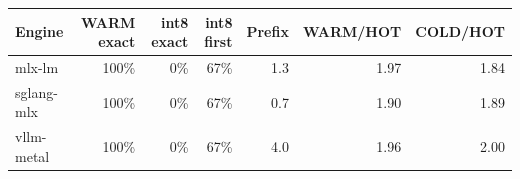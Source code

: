 \begin{tabular}{lrrrrrr}
\toprule
Engine & WARM exact & int8 exact & int8 first & Prefix & WARM/HOT & COLD/HOT \\
\midrule
mlx-lm & 100\% & 0\% & 67\% & 1.3 & 1.97 & 1.84 \\
sglang-mlx & 100\% & 0\% & 67\% & 0.7 & 1.90 & 1.89 \\
vllm-metal & 100\% & 0\% & 67\% & 4.0 & 1.96 & 2.00 \\
\bottomrule
\end{tabular}
